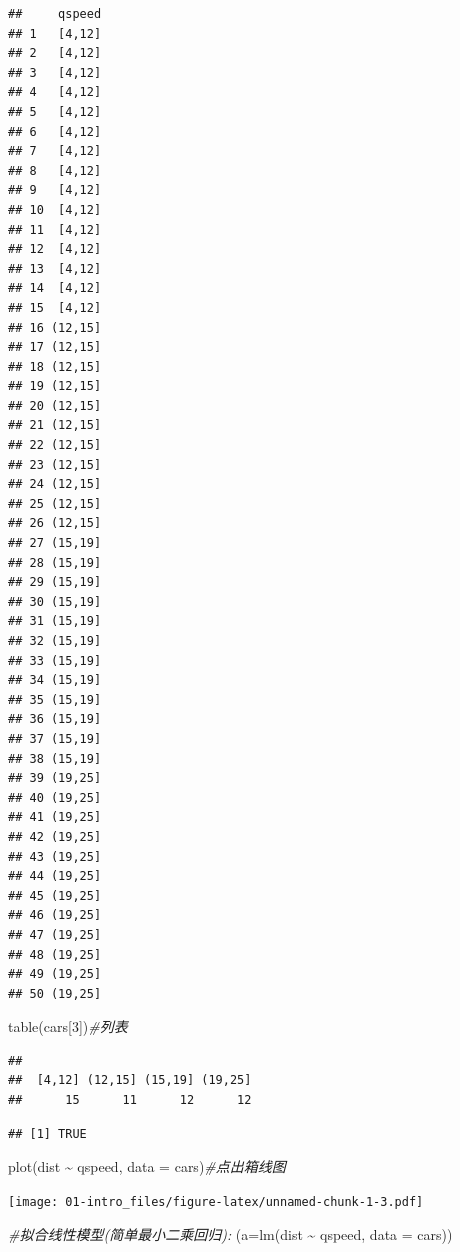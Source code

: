 \documentclass[
]{book}
\newenvironment{Shaded}{\begin{snugshade}}{\end{snugshade}}
\newcommand{\AttributeTok}[1]{\textcolor[rgb]{0.77,0.63,0.00}{#1}}
\newcommand{\CommentTok}[1]{\textcolor[rgb]{0.56,0.35,0.01}{\textit{#1}}}
\newcommand{\DecValTok}[1]{\textcolor[rgb]{0.00,0.00,0.81}{#1}}
\newcommand{\FunctionTok}[1]{\textcolor[rgb]{0.00,0.00,0.00}{#1}}
\newcommand{\NormalTok}[1]{#1}
\newcommand{\SpecialCharTok}[1]{\textcolor[rgb]{0.00,0.00,0.00}{#1}}
\begin{document}
\begin{verbatim}
##     qspeed
## 1   [4,12]
## 2   [4,12]
## 3   [4,12]
## 4   [4,12]
## 5   [4,12]
## 6   [4,12]
## 7   [4,12]
## 8   [4,12]
## 9   [4,12]
## 10  [4,12]
## 11  [4,12]
## 12  [4,12]
## 13  [4,12]
## 14  [4,12]
## 15  [4,12]
## 16 (12,15]
## 17 (12,15]
## 18 (12,15]
## 19 (12,15]
## 20 (12,15]
## 21 (12,15]
## 22 (12,15]
## 23 (12,15]
## 24 (12,15]
## 25 (12,15]
## 26 (12,15]
## 27 (15,19]
## 28 (15,19]
## 29 (15,19]
## 30 (15,19]
## 31 (15,19]
## 32 (15,19]
## 33 (15,19]
## 34 (15,19]
## 35 (15,19]
## 36 (15,19]
## 37 (15,19]
## 38 (15,19]
## 39 (19,25]
## 40 (19,25]
## 41 (19,25]
## 42 (19,25]
## 43 (19,25]
## 44 (19,25]
## 45 (19,25]
## 46 (19,25]
## 47 (19,25]
## 48 (19,25]
## 49 (19,25]
## 50 (19,25]
\end{verbatim}

\begin{Shaded}
\begin{Highlighting}[]
\FunctionTok{table}\NormalTok{(cars[}\DecValTok{3}\NormalTok{])}\CommentTok{\#列表}
\end{Highlighting}
\end{Shaded}

\begin{verbatim}
## 
##  [4,12] (12,15] (15,19] (19,25] 
##      15      11      12      12
\end{verbatim}

\begin{Shaded}
\end{Shaded}

\begin{verbatim}
## [1] TRUE
\end{verbatim}

\begin{Shaded}
\begin{Highlighting}[]
\FunctionTok{plot}\NormalTok{(dist }\SpecialCharTok{\textasciitilde{}}\NormalTok{ qspeed, }\AttributeTok{data =}\NormalTok{ cars)}\CommentTok{\#点出箱线图}
\end{Highlighting}
\end{Shaded}

\texttt{[image: 01-intro\_files/figure-latex/unnamed-chunk-1-3.pdf]}

\begin{Shaded}
\begin{Highlighting}[]
\CommentTok{\#拟合线性模型(简单最小二乘回归):}
\NormalTok{(}\AttributeTok{a=}\FunctionTok{lm}\NormalTok{(dist }\SpecialCharTok{\textasciitilde{}}\NormalTok{ qspeed, }\AttributeTok{data =}\NormalTok{ cars))}
\end{Highlighting}
\end{Shaded}
\end{document}
